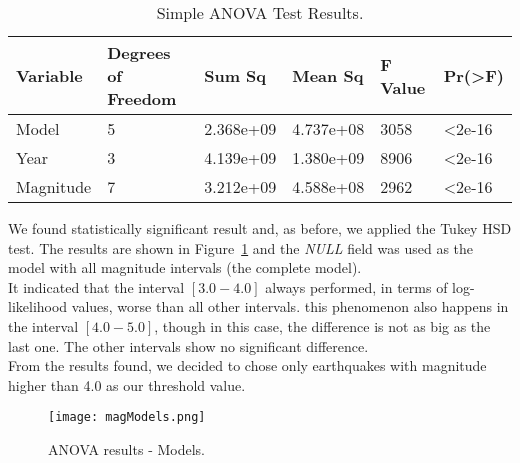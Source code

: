 \begin{table*}[!ht]
	\centering
	\begin{tabular}{|l|l|l|l|l|l|}
		\hline
		{Variable} & {Degrees of Freedom} & {Sum Sq}    & {Mean Sq}   & {F Value} & {Pr(\textgreater F)} \\
		\hline
		Model       & 5            	  & 2.368e+09      & 4.737e+08    & 3058     & \textless2e-16     \\
		\hline
		Year        & 3                  & 4.139e+09   & 1.380e+09    & 8906     & \textless2e-16     \\
		\hline
		Magnitude   & 7                  & 3.212e+09   & 4.588e+08    & 2962     & \textless2e-16	\\    
		\hline
	\end{tabular}
	\caption{Simple ANOVA Test Results.}
	\label{anovatestMag}
\end{table*}

We found statistically significant result and, as before, we applied the Tukey HSD test. The results are shown in Figure~\ref{modelANOVAMag} and the \textit{NULL} field was used as the model with all magnitude intervals (the complete model).\\

It indicated that the interval $[3.0-4.0]$ always performed, in terms of log-likelihood values, worse than all other intervals. this phenomenon also happens in the interval $[4.0-5.0]$, though in this case, the difference is not as big as the last one. The other intervals show no significant difference.\\

From the results found, we decided to chose only earthquakes with magnitude higher than 4.0 as our threshold value.\\

\begin{figure}[H]
	\centering
	\texttt{[image: magModels.png]}
	\caption{ANOVA results - Models.}
	\label{modelANOVAMag}
\end{figure}



